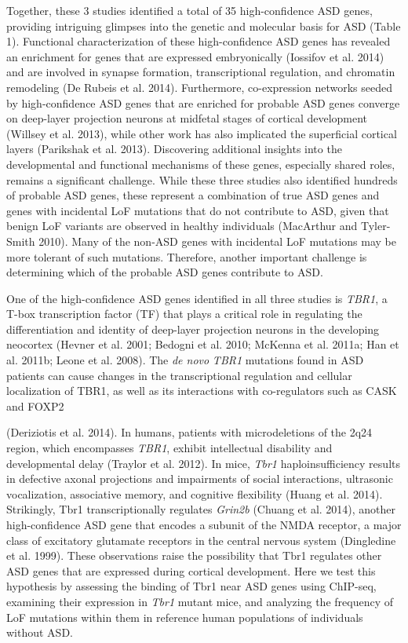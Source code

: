 \documentclass[]{article}
\begin{document}
Together, these 3 studies identified a total of 35 high-confidence ASD
genes, providing intriguing glimpses into the genetic and molecular
basis for ASD (Table 1). Functional characterization of these
high-confidence ASD genes has revealed an enrichment for genes that are
expressed embryonically (Iossifov et al. 2014) and are involved in
synapse formation, transcriptional regulation, and chromatin remodeling
(De Rubeis et al. 2014). Furthermore, co-expression networks seeded by
high-confidence ASD genes that are enriched for probable ASD genes
converge on deep-layer projection neurons at midfetal stages of cortical
development (Willsey et al. 2013), while other work has also implicated
the superficial cortical layers (Parikshak et al. 2013). Discovering
additional insights into the developmental and functional mechanisms of
these genes, especially shared roles, remains a significant challenge.
While these three studies also identified hundreds of probable ASD
genes, these represent a combination of true ASD genes and genes with
incidental LoF mutations that do not contribute to ASD, given that
benign LoF variants are observed in healthy individuals (MacArthur and
Tyler-Smith 2010). Many of the non-ASD genes with incidental LoF
mutations may be more tolerant of such mutations. Therefore, another
important challenge is determining which of the probable ASD genes
contribute to ASD.

One of the high-confidence ASD genes identified in all three studies is
\emph{TBR1}, a T-box transcription factor (TF) that plays a critical
role in regulating the differentiation and identity of deep-layer
projection neurons in the developing neocortex (Hevner et al. 2001;
Bedogni et al. 2010; McKenna et al. 2011a; Han et al. 2011b; Leone et
al. 2008). The \emph{de novo} \emph{TBR1} mutations found in ASD
patients can cause changes in the transcriptional regulation and
cellular localization of TBR1, as well as its interactions with
co-regulators such as CASK and FOXP2

(Deriziotis et al. 2014). In humans, patients with microdeletions of the
2q24 region, which encompasses \emph{TBR1}, exhibit intellectual
disability and developmental delay (Traylor et al. 2012). In mice,
\emph{Tbr1} haploinsufficiency results in defective axonal projections
and impairments of social interactions, ultrasonic vocalization,
associative memory, and cognitive flexibility (Huang et al. 2014).
Strikingly, Tbr1 transcriptionally regulates \emph{Grin2b} (Chuang et
al. 2014), another high-confidence ASD gene that encodes a subunit of
the NMDA receptor, a major class of excitatory glutamate receptors in
the central nervous system (Dingledine et al. 1999). These observations
raise the possibility that Tbr1 regulates other ASD genes that are
expressed during cortical development. Here we test this hypothesis by
assessing the binding of Tbr1 near ASD genes using ChIP-seq, examining
their expression in \emph{Tbr1} mutant mice, and analyzing the frequency
of LoF mutations within them in reference human populations of
individuals without ASD.
\end{document}
